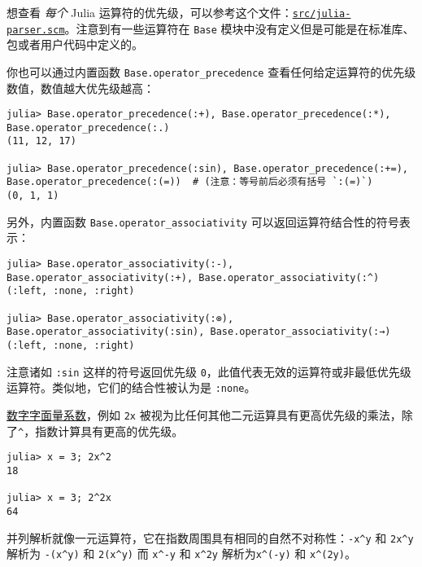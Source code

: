 想查看 \emph{每个} Julia 运算符的优先级，可以参考这个文件：\href{https://github.com/JuliaLang/julia/blob/master/src/julia-parser.scm}{\texttt{src/julia-parser.scm}}。注意到有一些运算符在 \texttt{Base} 模块中没有定义但是可能是在标准库、包或者用户代码中定义的。



你也可以通过内置函数 \texttt{Base.operator\_precedence} 查看任何给定运算符的优先级数值，数值越大优先级越高：




\begin{verbatim}
julia> Base.operator_precedence(:+), Base.operator_precedence(:*), Base.operator_precedence(:.)
(11, 12, 17)

julia> Base.operator_precedence(:sin), Base.operator_precedence(:+=), Base.operator_precedence(:(=))  # (注意：等号前后必须有括号 `:(=)`)
(0, 1, 1)
\end{verbatim}



另外，内置函数 \texttt{Base.operator\_associativity} 可以返回运算符结合性的符号表示：




\begin{verbatim}
julia> Base.operator_associativity(:-), Base.operator_associativity(:+), Base.operator_associativity(:^)
(:left, :none, :right)

julia> Base.operator_associativity(:⊗), Base.operator_associativity(:sin), Base.operator_associativity(:→)
(:left, :none, :right)
\end{verbatim}



注意诸如 \texttt{:sin} 这样的符号返回优先级 \texttt{0}，此值代表无效的运算符或非最低优先级运算符。类似地，它们的结合性被认为是 \texttt{:none}。



\hyperlink{7285052708387693199}{数字字面量系数}，例如 \texttt{2x}  被视为比任何其他二元运算具有更高优先级的乘法，除了\texttt{{\textasciicircum}}，指数计算具有更高的优先级。




\begin{verbatim}
julia> x = 3; 2x^2
18

julia> x = 3; 2^2x
64
\end{verbatim}



并列解析就像一元运算符，它在指数周围具有相同的自然不对称性：\texttt{-x{\textasciicircum}y} 和 \texttt{2x{\textasciicircum}y}解析为 \texttt{-(x{\textasciicircum}y)} 和 \texttt{2(x{\textasciicircum}y)} 而 \texttt{x{\textasciicircum}-y} 和 \texttt{x{\textasciicircum}2y} 解析为\texttt{x{\textasciicircum}(-y)} 和 \texttt{x{\textasciicircum}(2y)}。



